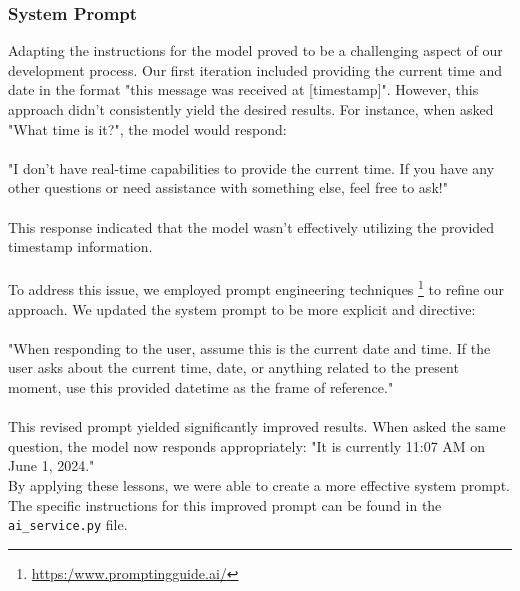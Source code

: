 \documentclass[
    a4paper,
    pagesize,
	pdftex,
    12pt,
]{scrartcl}
\begin{document}
\subsubsection{System Prompt}
Adapting the instructions for the model proved to be a challenging aspect of our development process. Our first iteration included providing the current time and date in the format "this message was received at [timestamp]". However, this approach didn't consistently yield the desired results. For instance, when asked "What time is it?", the model would respond: \\ \\
"I don't have real-time capabilities to provide the current time. If you have any other questions or need assistance with something else, feel free to ask!" \\ \\
This response indicated that the model wasn't effectively utilizing the provided timestamp information.
\\ \\
To address this issue, we employed prompt engineering techniques \footnote{\url{https:/www.promptingguide.ai/}} to refine our approach. We updated the system prompt to be more explicit and directive: \\ \\
"When responding to the user, assume this is the current date and time. If the user asks about the current time, date, or anything related to the present moment, use this provided datetime as the frame of reference."
\\ \\
This revised prompt yielded significantly improved results. When asked the same question, the model now responds appropriately: "It is currently 11:07 AM on June 1, 2024."
\\
By applying these lessons, we were able to create a more effective system prompt. The specific instructions for this improved prompt can be found in the \texttt{ai\_service.py} file.
\end{document}
